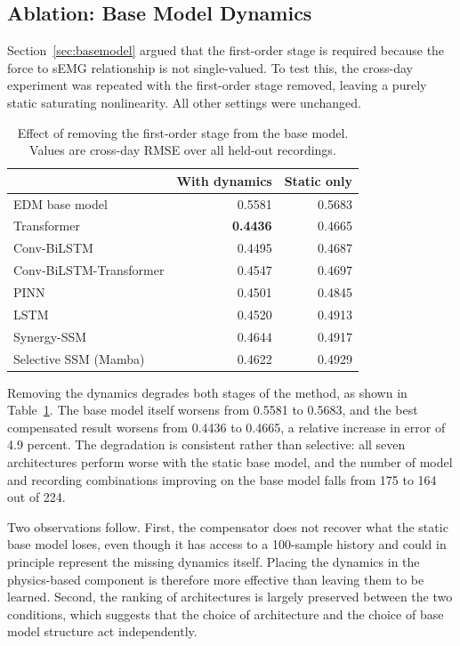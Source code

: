 \subsection{Ablation: Base Model Dynamics}
\label{sec:ablation-lpf}

Section~\ref{sec:basemodel} argued that the first-order stage is required
because the force to sEMG relationship is not single-valued. To test this, the
cross-day experiment was repeated with the first-order stage removed, leaving a
purely static saturating nonlinearity. All other settings were unchanged.

\begin{table}[!t]
\caption{Effect of removing the first-order stage from the base model. Values
are cross-day RMSE over all held-out recordings.}
\label{tab:lpf}
\centering
\begin{tabular}{lrr}
\toprule
 & With dynamics & Static only \\
\midrule
EDM base model          & 0.5581 & 0.5683 \\
Transformer             & \textbf{0.4436} & 0.4665 \\
Conv-BiLSTM             & 0.4495 & 0.4687 \\
Conv-BiLSTM-Transformer & 0.4547 & 0.4697 \\
PINN                    & 0.4501 & 0.4845 \\
LSTM                    & 0.4520 & 0.4913 \\
Synergy-SSM             & 0.4644 & 0.4917 \\
Selective SSM (Mamba)   & 0.4622 & 0.4929 \\
\bottomrule
\end{tabular}
\end{table}

Removing the dynamics degrades both stages of the method, as shown in
Table~\ref{tab:lpf}. The base model itself worsens from 0.5581 to 0.5683, and
the best compensated result worsens from 0.4436 to 0.4665, a relative increase
in error of 4.9 percent. The degradation is consistent rather than selective:
all seven architectures perform worse with the static base model, and the number
of model and recording combinations improving on the base model falls from 175
to 164 out of 224.

Two observations follow. First, the compensator does not recover what the static
base model loses, even though it has access to a 100-sample history and could in
principle represent the missing dynamics itself. Placing the dynamics in the
physics-based component is therefore more effective than leaving them to be
learned. Second, the ranking of architectures is largely preserved between the
two conditions, which suggests that the choice of architecture and the choice of
base model structure act independently.

